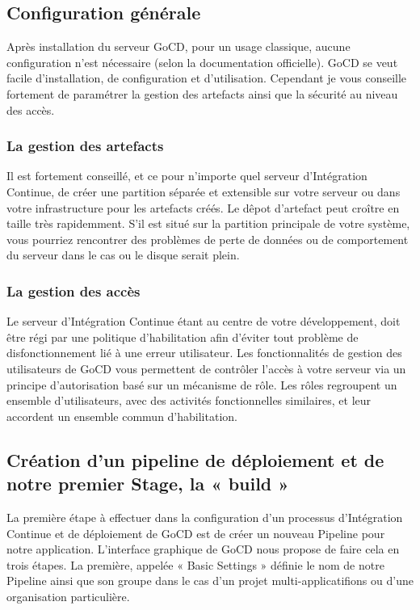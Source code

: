       \subsection{Configuration générale}
      Après installation du serveur GoCD, pour un usage classique, aucune configuration n'est nécessaire (selon la documentation officielle). GoCD se veut facile d'installation, de configuration et d'utilisation. Cependant je vous conseille fortement de paramétrer la gestion des artefacts ainsi que la sécurité au niveau des accès.

        \subsubsection{La gestion des artefacts}
        Il est fortement conseillé, et ce pour n'importe quel serveur d'Intégration Continue, de créer une partition séparée et extensible sur votre serveur ou dans votre infrastructure pour les artefacts créés. Le dêpot d'artefact peut croître en taille très rapidemment. S'il est situé sur la partition principale de votre système, vous pourriez rencontrer des problèmes de perte de données ou de comportement du serveur dans le cas ou le disque serait plein.

        \subsubsection{La gestion des accès}
        Le serveur d'Intégration Continue étant au centre de votre développement, doit être régi par une politique d'habilitation afin d'éviter tout problème de disfonctionnement lié à une erreur utilisateur. Les fonctionnalités de gestion des utilisateurs de GoCD vous permettent de contrôler l'accès à votre serveur via un principe d'autorisation basé sur un mécanisme de rôle. Les rôles regroupent un ensemble d'utilisateurs, avec des activités fonctionnelles similaires, et leur accordent un ensemble commun d'habilitation.

      \subsection{Création d'un pipeline de déploiement et de notre premier Stage, la « build »}
      La première étape à effectuer dans la configuration d'un processus d'Intégration Continue et de déploiement de GoCD est de créer un nouveau Pipeline pour notre application. L'interface graphique de GoCD nous propose de faire cela en trois étapes. La première, appelée « Basic Settings » définie le nom de notre Pipeline ainsi que son groupe dans le cas d'un projet multi-applicatifions ou d'une organisation particulière.\\

